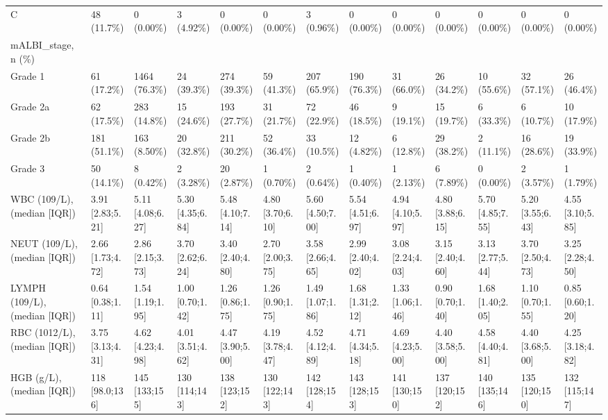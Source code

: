 \begin{landscape}
\begin{center}
\begin{longtable}{p{5.2cm}p{3.0cm}}
C & 48 (11.7\%) & 0 (0.00\%) & 3 (4.92\%) & 0 (0.00\%) & 0 (0.00\%) & 3 (0.96\%) & 0 (0.00\%) & 0 (0.00\%) & 0 (0.00\%) & 0 (0.00\%) & 0 (0.00\%) & 0 (0.00\%) \\
mALBI\_stage, n (\%) &  &  &  &  &  &  &  &  &  &  &  &  \\
Grade 1 & 61 (17.2\%) & 1464 (76.3\%) & 24 (39.3\%) & 274 (39.3\%) & 59 (41.3\%) & 207 (65.9\%) & 190 (76.3\%) & 31 (66.0\%) & 26 (34.2\%) & 10 (55.6\%) & 32 (57.1\%) & 26 (46.4\%) \\
Grade 2a & 62 (17.5\%) & 283 (14.8\%) & 15 (24.6\%) & 193 (27.7\%) & 31 (21.7\%) & 72 (22.9\%) & 46 (18.5\%) & 9 (19.1\%) & 15 (19.7\%) & 6 (33.3\%) & 6 (10.7\%) & 10 (17.9\%) \\
Grade 2b & 181 (51.1\%) & 163 (8.50\%) & 20 (32.8\%) & 211 (30.2\%) & 52 (36.4\%) & 33 (10.5\%) & 12 (4.82\%) & 6 (12.8\%) & 29 (38.2\%) & 2 (11.1\%) & 16 (28.6\%) & 19 (33.9\%) \\
Grade 3 & 50 (14.1\%) & 8 (0.42\%) & 2 (3.28\%) & 20 (2.87\%) & 1 (0.70\%) & 2 (0.64\%) & 1 (0.40\%) & 1 (2.13\%) & 6 (7.89\%) & 0 (0.00\%) & 2 (3.57\%) & 1 (1.79\%) \\
WBC (109/L), (median [IQR]) & 3.91 [2.83;5.21] & 5.11 [4.08;6.27] & 5.30 [4.35;6.84] & 5.48 [4.10;7.14] & 4.80 [3.70;6.10] & 5.60 [4.50;7.00] & 5.54 [4.51;6.97] & 4.94 [4.10;5.97] & 4.80 [3.88;6.15] & 5.70 [4.85;7.55] & 5.20 [3.55;6.43] & 4.55 [3.10;5.85] \\
NEUT (109/L), (median [IQR]) & 2.66 [1.73;4.72] & 2.86 [2.15;3.73] & 3.70 [2.62;6.24] & 3.40 [2.40;4.80] & 2.70 [2.00;3.75] & 3.58 [2.66;4.65] & 2.99 [2.40;4.02] & 3.08 [2.24;4.03] & 3.15 [2.40;4.60] & 3.13 [2.77;5.44] & 3.70 [2.50;4.73] & 3.25 [2.28;4.50] \\
LYMPH (109/L), (median [IQR]) & 0.64 [0.38;1.11] & 1.54 [1.19;1.95] & 1.00 [0.70;1.42] & 1.26 [0.86;1.75] & 1.26 [0.90;1.75] & 1.49 [1.07;1.86] & 1.68 [1.31;2.12] & 1.33 [1.06;1.46] & 0.90 [0.70;1.40] & 1.68 [1.40;2.05] & 1.10 [0.70;1.55] & 0.85 [0.60;1.20] \\
RBC (1012/L), (median [IQR]) & 3.75 [3.13;4.31] & 4.62 [4.23;4.98] & 4.01 [3.51;4.62] & 4.47 [3.90;5.00] & 4.19 [3.78;4.47] & 4.52 [4.12;4.89] & 4.71 [4.34;5.18] & 4.69 [4.23;5.00] & 4.40 [3.58;5.00] & 4.58 [4.40;4.81] & 4.40 [3.68;5.00] & 4.25 [3.18;4.82] \\
HGB (g/L), (median [IQR]) & 118 [98.0;136] & 145 [133;155] & 130 [114;143] & 138 [123;152] & 130 [122;143] & 142 [128;154] & 143 [128;153] & 141 [130;150] & 137 [120;152] & 140 [135;146] & 135 [120;150] & 132 [115;147] \\

\end{longtable}
\end{center}
\end{landscape}
